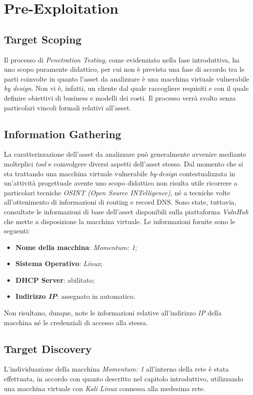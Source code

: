 
\chapter{Pre-Exploitation}

\section{Target Scoping} { }
Il processo di \emph{Penetration Testing}, come evidenziato nella fase introduttiva, ha uno scopo puramente didattico, per cui non è prevista una fase di accordo tra le parti coinvolte in quanto l'asset da analizzare è una macchina virtuale vulnerabile \emph{by design}. Non vi è, infatti, un cliente dal quale raccogliere requisiti e con il quale definire obiettivi di business e modelli dei costi. Il processo verrà svolto senza particolari vincoli formali relativi all'asset.

\section{Information Gathering} { }
La caratterizzazione dell'asset da analizzare può generalmente avvenire mediante molteplici \emph{tool} e coinvolgere diversi aspetti dell'asset stesso. Dal momento che si sta trattando una macchina virtuale vulnerabile \emph{by-design} contestualizzata in un'attività progettuale avente uno scopo didattico non risulta utile ricorrere a particolari tecniche \emph{OSINT (Open Source INTelligence)}, né a tecniche volte all'ottenimento di informazioni di routing e record DNS. Sono state, tuttavia, consultate le informazioni di base dell'asset disponibili sulla piattaforma \emph{VulnHub} che mette a disposizione la macchina virtuale. Le informazioni fornite sono le seguenti:
\begin{itemize}
    \item \textbf{Nome della macchina}: \emph{Momentum: 1};
    \item \textbf{Sistema Operativo}: \emph{Linux};
    \item \textbf{DHCP Server}: abilitato;
    \item \textbf{Indirizzo \emph{IP}}: assegnato in automatico.
\end{itemize}
Non risultano, dunque, note le informazioni relative all'indirizzo \emph{IP} della macchina né le credenziali di accesso alla stessa. 
\section{Target Discovery} { }
L'individuazione della macchina \emph{Momentum: 1} all'interno della rete è stata effettuata, in accordo con quanto descritto nel capitolo introduttivo, utilizzando una macchina virtuale con \emph{Kali Linux} connessa alla medesima rete. 

